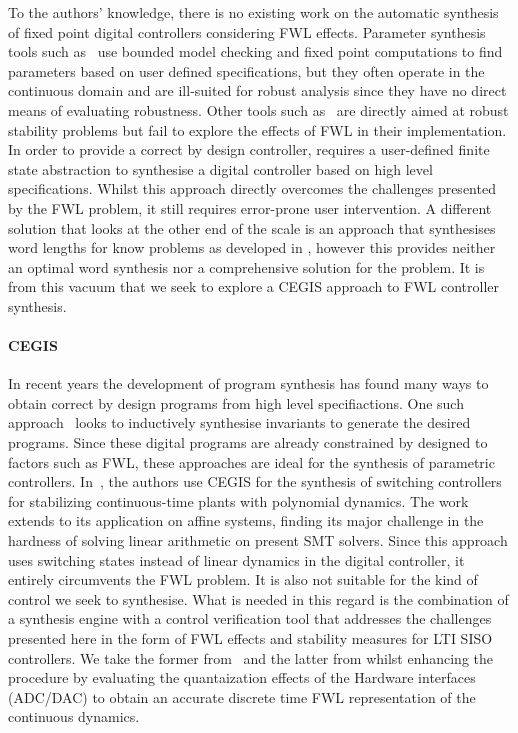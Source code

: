 \documentclass{sig-alternate-05-2015}
\begin{document}
To the authors' knowledge, there is no existing work on the automatic
synthesis of fixed point digital controllers considering FWL effects.  Parameter
synthesis tools such as~\cite{cimatti2013parameter} use bounded model
checking and fixed point computations to find parameters based on user
defined specifications, but they often operate in the continuous domain and
are ill-suited for robust analysis since they have no direct means of
evaluating robustness.  Other tools such as~\cite{economakos2016automated}
are directly aimed at robust stability problems but fail to explore the
effects of FWL in their implementation.  In order to provide a correct by
design controller, \cite{alur2016compositional} requires a user-defined
finite state abstraction to synthesise a digital controller based on high
level specifications.  Whilst this approach directly overcomes the
challenges presented by the FWL problem, it still requires error-prone user
intervention.  A different solution that looks at the other end of the scale
is an approach that synthesises word lengths for know problems as developed
in \cite{jha2013swati}, however this provides neither an optimal word
synthesis nor a comprehensive solution for the problem.  It is from this
vacuum that we seek to explore a CEGIS approach to FWL controller synthesis.

\paragraph{CEGIS}

In recent years the development of program synthesis has found many ways to
obtain correct by design programs from high level specifiactions.  One such
approach~\cite{itzhaky2010simple} looks to inductively synthesise invariants
to generate the desired programs.  Since these digital programs are already
constrained by designed to factors such as FWL, these approaches are ideal
for the synthesis of parametric controllers. 
In~\cite{DBLP:conf/cdc/RavanbakhshS15}, the authors use CEGIS for the
synthesis of switching controllers for stabilizing continuous-time plants
with polynomial dynamics.  The work extends to its application on affine
systems, finding its major challenge in the hardness of solving linear
arithmetic on present SMT solvers.  Since this approach uses switching
states instead of linear dynamics in the digital controller, it entirely
circumvents the FWL problem.  It is also not suitable for the kind of
control we seek to synthesise.  What is needed in this regard is the
combination of a synthesis engine with a control verification tool that
addresses the challenges presented here in the form of FWL effects and
stability measures for LTI SISO controllers.  We take the former
from~\cite{DBLP:conf/lpar/DavidKL15} and the latter from \cite{daes20161} whilst enhancing the
procedure by evaluating the quantaization effects of the Hardware interfaces
(ADC/DAC) to obtain an accurate discrete time FWL representation of the
continuous dynamics.
 
\end{document}
